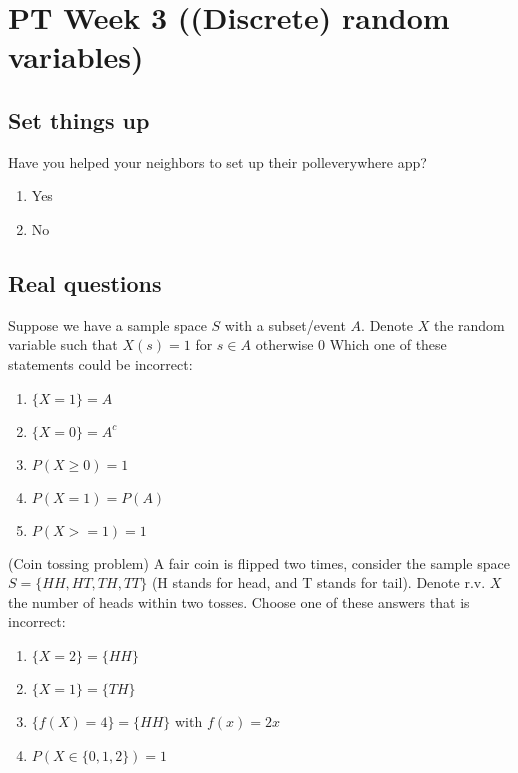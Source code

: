 \documentclass[poll_tutorial_format]{subfiles}
\begin{document}
	\maketitle
	\section{PT Week 3 ((Discrete) random variables)}
	
	\subsection{Set things up}
	\label{sec:set-things-up}
	
	
	
	\setcounter{theorem}{-1}
	
	\begin{exercise}
		Have you helped your neighbors to set up their polleverywhere app? 
		\begin{enumerate}
			\item Yes
			\item No
		\end{enumerate}
	\end{exercise}
	
	\subsection{Real questions}
	\label{sec:start-real-questions pt week 3}
	\begin{exercise}
		Suppose we have a sample space $S$ with a subset/event $A$. Denote $X$ the random variable such that $X(s)=1$ for $s\in A$ otherwise $0$ 
		Which one of these statements could be incorrect:%
		\begin{enumerate}
			\item $\{X=1\}=A$
			\item $\{X=0\}=A^c$
			\item $P(X\geq 0)=1$
			\item $P(X=1)=P(A)$
			\item $P(X>=1)=1$ 
		\end{enumerate}
	\end{exercise}


	\begin{exercise}
	(Coin tossing problem) A fair coin is flipped two times, consider the sample space $S=\{HH, HT, TH, TT\}$ (H stands for head, and T stands for tail). Denote r.v. $X$ the number of heads within two tosses.
	Choose one of these answers that is incorrect: %
	\begin{enumerate}
		\item $\{X=2\}=\{HH\}$
		\item $ \{X=1\}=\{TH\}$
		\item $\{f(X) =4\} =\{HH\} $ with $f(x)=2x$
		\item $ P(X\in \{0,1,2\}) =1$
	\end{enumerate}
\end{exercise}
\end{document}
